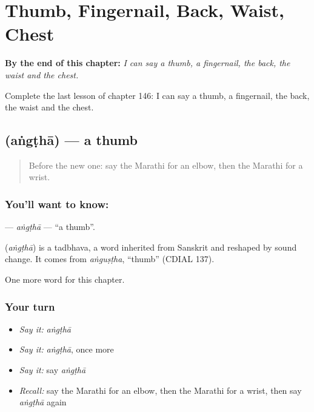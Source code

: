 
\chapter{Thumb, Fingernail, Back, Waist, Chest}
\label{ch:mr-thumb-fingernail-back-waist-chest}

\begin{chapteropening}
\textbf{By the end of this chapter:} \emph{I can say a thumb, a fingernail, the back, the waist and the chest.}

Complete the last lesson of chapter 146: I can say a thumb, a fingernail, the back, the waist and the chest.
\end{chapteropening}

\section[\texorpdfstring{\mr{अंगठा} (aṅgṭhā)}{अंगठा (aṅgṭhā)}]{ (aṅgṭhā) — a thumb}

\label{lesson:MR-C146-angtha}



\begin{quote}
Before the new one: say the Marathi for an elbow, then the Marathi for a wrist.
\end{quote}

\subsection*{You'll want to know: }
\textbf{} — \emph{aṅgṭhā} — \textquotedblleft{}a thumb\textquotedblright{}.

\begin{cousinweb}
\textbf{} (\emph{aṅgṭhā}) is a tadbhava, a word inherited from Sanskrit and reshaped by sound change. It comes from \emph{aṅguṣṭha}, \textquotedblleft{}thumb\textquotedblright{} (CDIAL 137).
\end{cousinweb}

\begin{grammarlens}[title={What you've built}]
One more word for this chapter.
\end{grammarlens}

\subsection*{Your turn}
\begin{itemize}
\raggedright
  \item \emph{Say it:} \emph{aṅgṭhā}
  \item \emph{Say it:} \emph{aṅgṭhā}, once more
  \item \emph{Say it:} say \emph{aṅgṭhā}
  \item \emph{Recall:} say the Marathi for an elbow, then the Marathi for a wrist, then say \emph{aṅgṭhā} again
\end{itemize}

